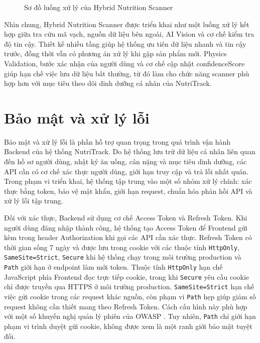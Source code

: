\documentclass[12pt, a4paper]{report}
\begin{document}
\begin{figure}[!htbp]
    \caption{Sơ đồ luồng xử lý của Hybrid Nutrition Scanner}
    \label{fig:hybrid_scanner_flow}
\end{figure}

Nhìn chung, Hybrid Nutrition Scanner được triển khai như một luồng xử lý kết hợp giữa tra cứu mã vạch, nguồn dữ liệu bên ngoài, AI Vision và cơ chế kiểm tra độ tin cậy. Thiết kế nhiều tầng giúp hệ thống ưu tiên dữ liệu nhanh và tin cậy trước, đồng thời vẫn có phương án xử lý khi gặp sản phẩm mới. Physics Validation, bước xác nhận của người dùng và cơ chế cập nhật confidenceScore giúp hạn chế việc lưu dữ liệu bất thường, từ đó làm cho chức năng scanner phù hợp hơn với mục tiêu theo dõi dinh dưỡng cá nhân của NutriTrack.
\section{Bảo mật và xử lý lỗi}Bảo mật và xử lý lỗi là phần hỗ trợ quan trọng trong quá trình vận hành Backend của hệ thống NutriTrack. Do hệ thống lưu trữ dữ liệu cá nhân liên quan đến hồ sơ người dùng, nhật ký ăn uống, cân nặng và mục tiêu dinh dưỡng, các API cần có cơ chế xác thực người dùng, giới hạn truy cập và trả lỗi nhất quán. Trong phạm vi triển khai, hệ thống tập trung vào một số nhóm xử lý chính: xác thực bằng token, bảo vệ mật khẩu, giới hạn request, chuẩn hóa phản hồi API và xử lý lỗi tập trung.

Đối với xác thực, Backend sử dụng cơ chế Access Token và Refresh Token. Khi người dùng đăng nhập thành công, hệ thống tạo Access Token để Frontend gửi kèm trong header Authorization khi gọi các API cần xác thực. Refresh Token có thời gian sống 7 ngày và được lưu trong cookie với các thuộc tính \texttt{HttpOnly}, \texttt{SameSite=Strict}, \texttt{Secure} khi hệ thống chạy trong môi trường production và \texttt{Path} giới hạn ở endpoint làm mới token. Thuộc tính \texttt{HttpOnly} hạn chế JavaScript phía Frontend đọc trực tiếp cookie, trong khi \texttt{Secure} yêu cầu cookie chỉ được truyền qua HTTPS ở môi trường production. \texttt{SameSite=Strict} hạn chế việc gửi cookie trong các request khác nguồn, còn phạm vi \texttt{Path} hẹp giúp giảm số request không cần thiết mang theo Refresh Token. Cách cấu hình này phù hợp với một số khuyến nghị quản lý phiên của OWASP \cite{owaspSessionManagement}. Tuy nhiên, \texttt{Path} chỉ giới hạn phạm vi trình duyệt gửi cookie, không được xem là một ranh giới bảo mật tuyệt đối.
\end{document}
